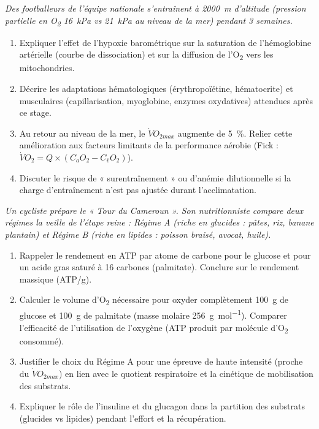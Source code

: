 \documentclass[11pt]{article}
\begin{document}
\begin{exercice}
    \textit{Des footballeurs de l'équipe nationale s'entraînent à \SI{2000}{m} d'altitude (pression partielle en O\textsubscript{2} \approx \SI{16}{kPa} vs \SI{21}{kPa} au niveau de la mer) pendant 3 semaines.}
    \begin{enumerate}
        \item Expliquer l'effet de l'hypoxie barométrique sur la saturation de l'hémoglobine artérielle (courbe de dissociation) et sur la diffusion de l'O\textsubscript{2} vers les mitochondries.
        \item Décrire les adaptations hématologiques (érythropoïétine, hématocrite) et musculaires (capillarisation, myoglobine, enzymes oxydatives) attendues après ce stage.
        \item Au retour au niveau de la mer, le $\dot{V}O_{2max}$ augmente de \SI{5}{\%}. Relier cette amélioration aux facteurs limitants de la performance aérobie (Fick : $\dot{V}O_2 = Q \times (C_{a}O_2 - C_{\bar{v}}O_2)$).
        \item Discuter le risque de « surentraînement » ou d'anémie dilutionnelle si la charge d'entraînement n'est pas ajustée durant l'acclimatation.
    \end{enumerate}
\end{exercice}

\begin{exercice}
    \textit{Un cycliste prépare le « Tour du Cameroun ». Son nutritionniste compare deux régimes la veille de l'étape reine : Régime A (riche en glucides : pâtes, riz, banane plantain) et Régime B (riche en lipides : poisson braisé, avocat, huile).}
    \begin{enumerate}
        \item Rappeler le rendement en ATP par atome de carbone pour le glucose et pour un acide gras saturé à 16 carbones (palmitate). Conclure sur le rendement massique (ATP/g).
        \item Calculer le volume d'O\textsubscript{2} nécessaire pour oxyder complètement \SI{100}{g} de glucose et \SI{100}{g} de palmitate (masse molaire \approx \SI{256}{g.mol^{-1}}). Comparer l'efficacité de l'utilisation de l'oxygène (ATP produit par molécule d'O\textsubscript{2} consommé).
        \item Justifier le choix du Régime A pour une épreuve de haute intensité (proche du $\dot{V}O_{2max}$) en lien avec le quotient respiratoire et la cinétique de mobilisation des substrats.
        \item Expliquer le rôle de l'insuline et du glucagon dans la partition des substrats (glucides vs lipides) pendant l'effort et la récupération.
    \end{enumerate}
\end{exercice}
\end{document}
